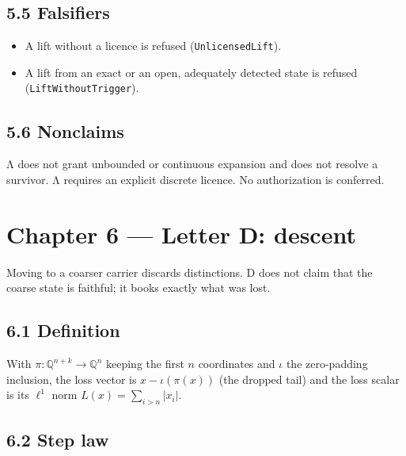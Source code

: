 \documentclass[
  11pt,
]{article}
\newenvironment{Shaded}{}{}
\newcommand{\NormalTok}[1]{#1}
\providecommand{\tightlist}{%
  \setlength{\itemsep}{0pt}\setlength{\parskip}{0pt}}
\renewcommand{\_}{\ddcunderscore\allowbreak}
\begin{document}
\subsection{5.5 Falsifiers}\label{falsifiers-4}

\begin{itemize}
\tightlist
\item
  A lift without a licence is refused (\texttt{Unlicensed\allowbreak Lift}).
\item
  A lift from an exact or an open, adequately detected state is refused
  (\texttt{Lift\allowbreak Without\allowbreak Trigger}).
\end{itemize}

\subsection{5.6 Nonclaims}\label{nonclaims-4}

\begin{Shaded}
\begin{Highlighting}[]
\NormalTok{Λ does not grant unbounded or continuous expansion and does not resolve a survivor.}
\NormalTok{Λ requires an explicit discrete licence. No authorization is conferred.}
\end{Highlighting}
\end{Shaded}

\section{Chapter 6 --- Letter D: descent}\label{chapter-6}

Moving to a coarser carrier discards distinctions. D does not claim that
the coarse state is faithful; it books exactly what was lost.

\subsection{6.1 Definition}\label{definition-6}

With \(\pi : \mathbb{Q}^{n+k} \to \mathbb{Q}^n\) keeping the first \(n\)
coordinates and \(\iota\) the zero-padding inclusion, the loss vector is
\(x - \iota(\pi(x))\) (the dropped tail) and the loss scalar is its
\(\ell^1\) norm \(L(x) = \sum_{i > n} \lvert x_i \rvert\).

\subsection{6.2 Step law}\label{step-law-5}
\end{document}
